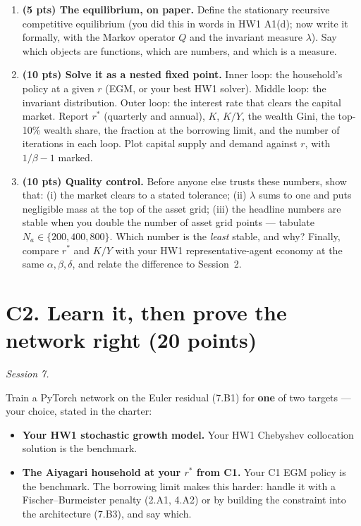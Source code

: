 \documentclass[11pt]{article}
\newif\ifsolutions \solutionsfalse
\newcommand{\solution}[1]{\ifsolutions\medskip
  {\color{blue!45!black}\textbf{Solution.} #1}\medskip\fi}
\begin{document}
\begin{enumerate}[label=(\alph*), leftmargin=*]

\item \textbf{(5 pts) The equilibrium, on paper.} Define the stationary recursive competitive
equilibrium (you did this in words in HW1 A1(d); now write it formally, with the Markov operator $Q$
and the invariant measure $\lambda$). Say which objects are functions, which are numbers, and which
is a measure.

\solution{\keyCone}

\item \textbf{(10 pts) Solve it as a nested fixed point.} Inner loop: the household's policy at a
given $r$ (EGM, or your best HW1 solver). Middle loop: the invariant distribution. Outer loop: the
interest rate that clears the capital market. Report $r^*$ (quarterly and annual), $K$, $K/Y$, the
wealth Gini, the top-10\% wealth share, the fraction at the borrowing limit, and the number of
iterations in each loop. Plot capital supply and demand against $r$, with $1/\beta-1$ marked.

\solution{\keyCtwo}

\item \textbf{(10 pts) Quality control.} Before anyone else trusts these numbers, show that:
(i) the market clears to a stated tolerance; (ii) $\lambda$ sums to one and puts negligible mass at
the top of the asset grid; (iii) the headline numbers are stable when you double the number of asset
grid points --- tabulate $N_a\in\{200,400,800\}$. Which number is the \emph{least} stable, and why?
Finally, compare $r^*$ and $K/Y$ with your HW1 representative-agent economy at the same
$\alpha,\beta,\delta$, and relate the difference to Session~2.

\solution{\keyCthree}

\end{enumerate}

\section*{C2. Learn it, then prove the network right (20 points)}
\emph{Session 7.}

Train a PyTorch network on the Euler residual (7.B1) for \textbf{one} of two targets --- your choice,
stated in the charter:
\begin{itemize}[leftmargin=*,itemsep=0pt]
  \item[(A)] \textbf{Your HW1 stochastic growth model.} Your HW1 Chebyshev collocation solution is the
        benchmark.
  \item[(B)] \textbf{The Aiyagari household at your $r^*$ from C1.} Your C1 EGM policy is the
        benchmark. The borrowing limit makes this harder: handle it with a Fischer--Burmeister penalty
        (2.A1, 4.A2) or by building the constraint into the architecture (7.B3), and say which.
\end{itemize}
\end{document}
